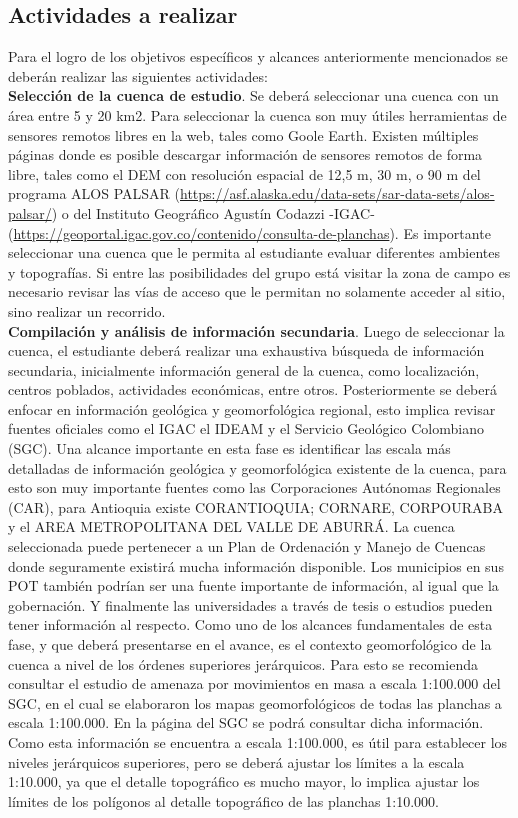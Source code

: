 \documentclass[twoside,11pt,]{article}
\begin{document}
\subsection{Actividades a realizar}
Para el logro de los objetivos específicos y alcances anteriormente mencionados se deberán realizar las siguientes actividades:\\
\textbf{Selección de la cuenca de estudio}. Se deberá seleccionar una cuenca con un área entre 5 y 20 km2. Para seleccionar la cuenca son muy útiles herramientas de sensores remotos libres en la web, tales como Goole Earth. Existen múltiples páginas donde es posible descargar información de sensores remotos de forma libre, tales como el DEM con resolución espacial de 12,5 m, 30 m, o 90 m del programa ALOS PALSAR (\url{https://asf.alaska.edu/data-sets/sar-data-sets/alos-palsar/}) o del Instituto Geográfico Agustín Codazzi -IGAC- (\url{https://geoportal.igac.gov.co/contenido/consulta-de-planchas}). Es importante seleccionar una cuenca que le permita al estudiante evaluar diferentes ambientes y topografías. Si entre las posibilidades del grupo está visitar la zona de campo es necesario revisar las vías de acceso que le permitan no solamente acceder al sitio, sino realizar un recorrido.
\\
\textbf{Compilación y análisis de información secundaria}. Luego de seleccionar la cuenca, el estudiante deberá realizar una exhaustiva búsqueda de información secundaria, inicialmente información general de la cuenca, como localización, centros poblados, actividades económicas, entre otros. Posteriormente se deberá enfocar en información geológica y geomorfológica regional, esto implica revisar fuentes oficiales como el IGAC el IDEAM y el Servicio Geológico Colombiano (SGC). Una alcance importante en esta fase es identificar las escala más detalladas de información geológica y geomorfológica existente de la cuenca, para esto son muy importante fuentes como las Corporaciones Autónomas Regionales (CAR), para Antioquia existe CORANTIOQUIA; CORNARE, CORPOURABA y el AREA METROPOLITANA DEL VALLE DE ABURRÁ. La cuenca seleccionada puede pertenecer a un Plan de Ordenación y Manejo de Cuencas donde seguramente existirá mucha información disponible. Los municipios en sus POT también podrían ser una fuente importante de información, al igual que la gobernación. Y finalmente las universidades a través de tesis o estudios pueden tener información al respecto. Como uno de los alcances fundamentales de esta fase, y que deberá presentarse en el avance, es el contexto geomorfológico de la cuenca a nivel de los órdenes superiores jerárquicos. Para esto se recomienda consultar el estudio de amenaza por movimientos en masa a escala 1:100.000 del SGC, en el cual se elaboraron los mapas geomorfológicos de todas las planchas a escala 1:100.000. En la página del SGC se podrá consultar dicha información. Como esta información se encuentra a escala 1:100.000, es útil para establecer los niveles jerárquicos superiores, pero se deberá ajustar los límites a la escala 1:10.000, ya que el detalle topográfico es mucho mayor, lo implica ajustar los límites de los polígonos al detalle topográfico de las planchas 1:10.000.
\end{document}
